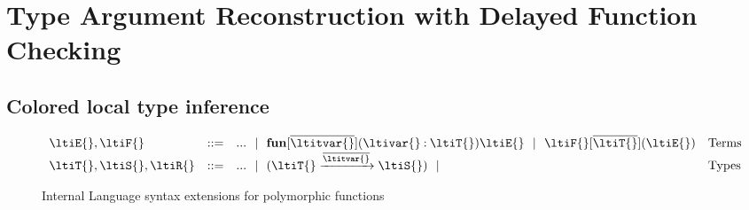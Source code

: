 \chapter{Type Argument Reconstruction with Delayed Function Checking}
\label{chapter:symbolic:directed-lti}

\section{Colored local type inference}

\begin{figure}
$$
\begin{array}{lrll}
  \ltiE{}, \ltiF{} &::=& ... \alt
                         \ltifun{\ova{\ltitvar{}}}{\ltivar{}}{\ltiT{}}{\ltiE{}} \alt
                         \ltiappinst{\ltiF{}}{\ova{\ltiT{}}}{\ltiE{}}
                      &\mbox{Terms} \\
  \ltiT{}, \ltiS{}, \ltiR{} &::=& ... \alt
                         \ltiArrow{\ltiT{}}{\ova{\ltitvar{}}}{\ltiS{}} \alt
                      &\mbox{Types} \\
\end{array}
$$
\caption{Internal Language syntax extensions for polymorphic functions}
\label{symbolic:figure:internal-language}
\end{figure}

